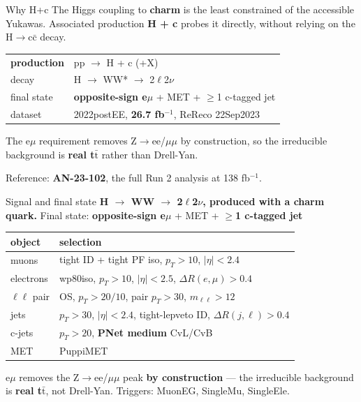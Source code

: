 \documentclass[aspectratio=169,10pt]{beamer}
\newcommand{\code}[1]{{\ttfamily\small\colorbox{codebg}{#1}}}
\begin{document}
\begin{frame}{Why H+c}
The Higgs coupling to \textbf{charm} is the least constrained of the accessible
Yukawas. Associated production \textbf{H + c} probes it directly, without relying
on the H$\rightarrow$c$\bar{\text{c}}$ decay.
\vspace{0.4em}
\begin{center}
\begin{tabular}{ll}
\toprule
\textbf{production} & pp $\rightarrow$ H + c (+X) \\
decay & H $\rightarrow$ WW* $\rightarrow$ 2$\ell$2$\nu$ \\
final state & \textbf{opposite-sign e$\mu$} + MET + $\geq$1 c-tagged jet \\
dataset & 2022postEE, \textbf{26.7 fb$^{-1}$}, ReReco \code{22Sep2023} \\
\bottomrule
\end{tabular}
\end{center}
\vspace{0.3em}
\begin{keybox}
The e$\mu$ requirement removes Z$\rightarrow$ee/$\mu\mu$ by construction, so the
irreducible background is \textbf{real t$\bar{\text{t}}$} rather than Drell-Yan.
\end{keybox}
\vspace{0.2em}
{\small Reference: \textbf{AN-23-102}, the full Run 2 analysis at 138 fb$^{-1}$.}
\end{frame}

\begin{frame}{Signal and final state}
\textbf{H $\rightarrow$ WW $\rightarrow$ 2$\ell$2$\nu$, produced with a charm quark.}
Final state: \textbf{opposite-sign e$\mu$} + MET + \textbf{$\geq$1 c-tagged jet}
\vspace{0.3em}
\begin{center}
\small
\begin{tabular}{ll}
\toprule
object & selection \\
\midrule
muons & tight ID + tight PF iso, $p_T > 10$, $|\eta| < 2.4$ \\
electrons & wp80iso, $p_T > 10$, $|\eta| < 2.5$, $\Delta R(e,\mu) > 0.4$ \\
$\ell\ell$ pair & OS, $p_T > 20/10$, pair $p_T > 30$, $m_{\ell\ell} > 12$ \\
jets & $p_T > 30$, $|\eta| < 2.4$, tight-lepveto ID, $\Delta R(j,\ell) > 0.4$ \\
c-jets & $p_T > 20$, \textbf{PNet medium} CvL/CvB \\
MET & PuppiMET \\
\bottomrule
\end{tabular}
\end{center}
\vspace{0.3em}
\begin{keybox}
e$\mu$ removes the Z$\rightarrow$ee/$\mu\mu$ peak \textbf{by construction} --- the
irreducible background is \textbf{real t$\bar{\text{t}}$}, not Drell-Yan.
Triggers: MuonEG, SingleMu, SingleEle.
\end{keybox}
\end{frame}
\end{document}
